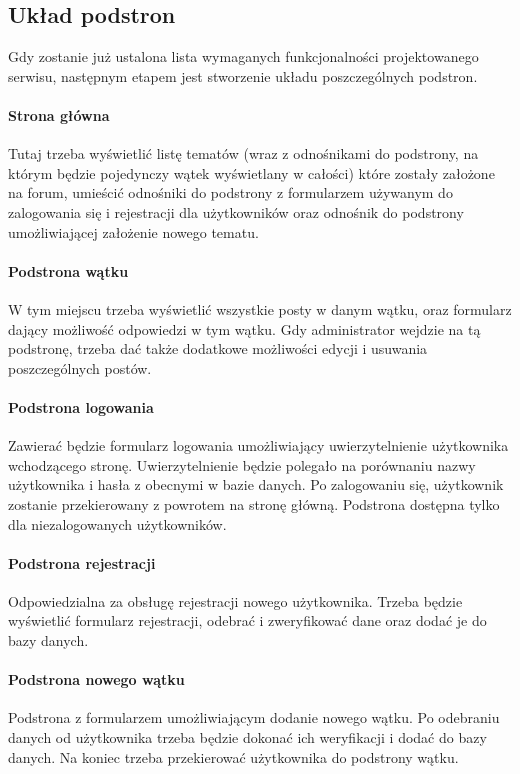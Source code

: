 \documentclass[a4paper,10pt]{article}
\begin{document}
\subsection{Układ podstron}
Gdy zostanie już ustalona lista wymaganych funkcjonalności projektowanego serwisu, następnym etapem jest stworzenie układu poszczególnych podstron.
\paragraph{Strona główna} Tutaj trzeba wyświetlić listę tematów (wraz z odnośnikami do podstrony, na którym będzie pojedynczy wątek wyświetlany w całości) które zostały założone na forum, umieścić odnośniki do podstrony z formularzem używanym do zalogowania się i rejestracji dla użytkowników oraz odnośnik do podstrony umożliwiającej założenie nowego tematu.
\paragraph{Podstrona wątku} W tym miejscu trzeba wyświetlić wszystkie posty w danym wątku, oraz formularz dający możliwość odpowiedzi w tym wątku. Gdy administrator wejdzie na tą podstronę, trzeba dać także dodatkowe możliwości edycji i usuwania poszczególnych postów.
\paragraph{Podstrona logowania} Zawierać będzie formularz logowania umożliwiający uwierzytelnienie użytkownika wchodzącego stronę. Uwierzytelnienie będzie polegało na porównaniu nazwy użytkownika i hasła z obecnymi w bazie danych. Po zalogowaniu się, użytkownik zostanie przekierowany z powrotem na stronę główną. Podstrona dostępna tylko dla niezalogowanych użytkowników.
\paragraph{Podstrona rejestracji} Odpowiedzialna za obsługę rejestracji nowego użytkownika. Trzeba będzie wyświetlić formularz rejestracji, odebrać i zweryfikować dane oraz dodać je do bazy danych.

\paragraph{Podstrona nowego wątku} Podstrona z formularzem umożliwiającym dodanie nowego wątku. Po odebraniu danych od użytkownika trzeba będzie dokonać ich weryfikacji i dodać do bazy danych. Na koniec trzeba przekierować użytkownika do podstrony wątku.
\end{document}
